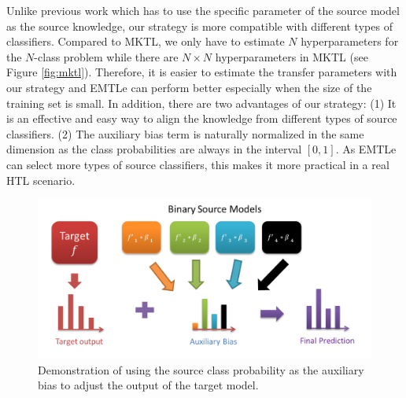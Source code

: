 Unlike previous work\cite{aytar2011tabula,tommasi2014learning,yang2007adapting} which has to use the specific parameter of the source model as the source knowledge, our strategy is more compatible with different types of classifiers. Compared to MKTL\cite{jie2011multiclass}, we only have to estimate $N$ hyperparameters for the $N$-class problem while there are \mbox{$N\times N$} hyperparameters in MKTL (see Figure \ref{fig:mktl}). Therefore, it is easier to estimate the transfer parameters with our strategy and EMTLe can perform better especially when the size of the training set is small.
In addition, there are two advantages of our strategy: (1) It is an effective and easy way to align the knowledge from different types of source classifiers.
(2) The auxiliary bias term is naturally normalized in the same dimension as the class probabilities are always in the interval $[0,1]$.  As EMTLe can select more types of source classifiers, this makes it more practical in a real HTL scenario.

\begin{figure}
	\centering
	\includegraphics[scale=.7]{pakdd/fig/ab.png}
	\caption{Demonstration of using the source class probability as the auxiliary bias to adjust the output of the target model.}%
	\label{fig:ab}
\end{figure}


